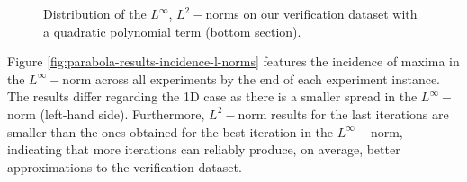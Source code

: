 \documentclass[12pt]{report} %
\begin{document}
\begin{figure}
\begin{tabular}{cccccc}
  \end{tabular}
  \caption{Distribution of the $L^\infty$, $L^2-$norms on our verification dataset
    with a quadratic polynomial term (bottom section).}
  \label{fig:parabola-results-overall-poly2}
\end{figure}

Figure \ref{fig:parabola-results-incidence-l-norms} features the incidence of maxima in the $L^\infty-$norm across all experiments by the end of each experiment instance. The results differ regarding the 1D case as there is a smaller spread in the $L^\infty-$norm (left-hand side). Furthermore, $L^2-$norm results for the last iterations are smaller than the ones obtained for the best iteration in the $L^\infty-$norm, indicating that more iterations can reliably produce, on average, better approximations to the verification dataset.
\end{document}
